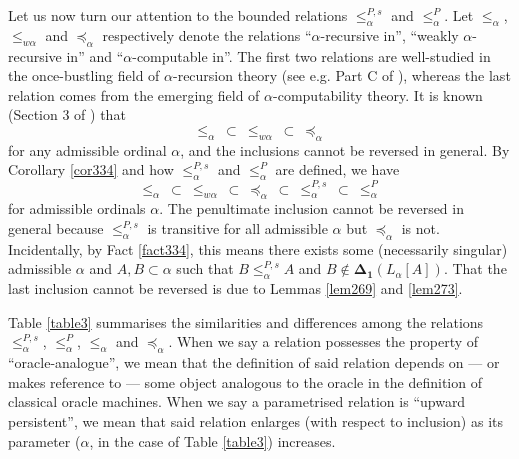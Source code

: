 \documentclass[12pt, twoside]{memoir}
\numberwithin{equation}{section}
\theoremstyle{definition}
\theoremstyle{remark}
\theoremstyle{definition}
\theoremstyle{definition}
\theoremstyle{definition}
\theoremstyle{remark}
\begin{document}
Let us now turn our attention to the bounded relations $\leq^{P, s}_{\alpha}$ and $\leq^P_{\alpha}$. Let $\leq_{\alpha}$, $\leq_{w \alpha}$ and $\preceq_{\alpha}$ respectively denote the relations ``$\alpha$-recursive in'', ``weakly $\alpha$-recursive in'' and ``$\alpha$-computable in''. The first two relations are well-studied in the once-bustling field of $\alpha$-recursion theory (see e.g. Part C of \cite{sacks}), whereas the last relation comes from the emerging field of $\alpha$-computability theory. It is known (Section 3 of \cite{koepke2}) that 
\begin{equation*}
    \leq_{\alpha} \ \subset \ \leq_{w \alpha} \ \subset \ \preceq_{\alpha}
\end{equation*}
for any admissible ordinal $\alpha$, and the inclusions cannot be reversed in general. By Corollary \ref{cor334} and how $\leq^{P, s}_{\alpha}$ and $\leq^P_{\alpha}$ are defined, we have
\begin{equation}\label{eq2}
    \leq_{\alpha} \ \subset \ \leq_{w \alpha} \ \subset \ \preceq_{\alpha} \ \subset \ \leq^{P, s}_{\alpha} \ \subset \ \leq^P_{\alpha}
\end{equation}
for admissible ordinals $\alpha$. The penultimate inclusion cannot be reversed in general because $\leq^{P, s}_{\alpha}$ is transitive for all admissible $\alpha$ but $\preceq_{\alpha}$ is not. Incidentally, by Fact \ref{fact334}, this means there exists some (necessarily singular) admissible $\alpha$ and $A, B \subset \alpha$ such that $B \leq^{P, s}_{\alpha} A$ and $B \not\in \mathbf{\Delta_1}(L_{\alpha}[A])$. That the last inclusion cannot be reversed is due to Lemmas \ref{lem269} and \ref{lem273}. 

Table \ref{table3} summarises the similarities and differences among the relations $\leq^{P, s}_{\alpha}$, $\leq^P_{\alpha}$, $\leq_{\alpha}$ and $\preceq_{\alpha}$. When we say a relation possesses the property of ``oracle-analogue'', we mean that the definition of said relation depends on --- or makes reference to --- some object analogous to the oracle in the definition of classical oracle machines. When we say a parametrised relation is ``upward persistent'', we mean that said relation enlarges (with respect to inclusion) as its parameter ($\alpha$, in the case of Table \ref{table3}) increases.
\end{document}
